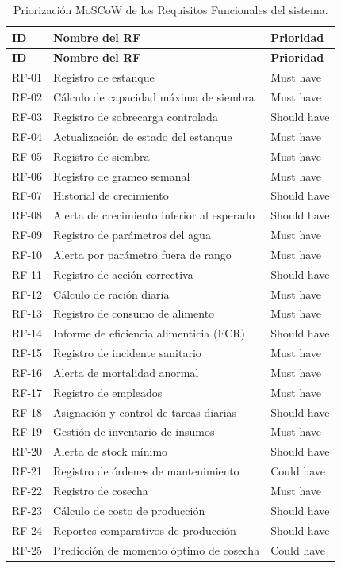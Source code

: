 \documentclass[11pt,a4paper]{article}
\begin{document}
\begin{longtable}{|p{2cm}|p{8cm}|p{4cm}|}
\caption{Priorización MoSCoW de los Requisitos Funcionales del sistema.}
\label{tab:moscow-rf} \\
\hline

\textbf{ID} & \textbf{Nombre del RF} & \textbf{Prioridad} \\
\hline

\endfirsthead

\hline
\textbf{ID} & \textbf{Nombre del RF} & \textbf{Prioridad} \\
\hline
\endhead

\hline
\endfoot

\hline
\endlastfoot

RF-01 & Registro de estanque & Must have \\
\hline
RF-02 & Cálculo de capacidad máxima de siembra & Must have \\
\hline
RF-03 & Registro de sobrecarga controlada & Should have \\
\hline
RF-04 & Actualización de estado del estanque & Must have \\
\hline
RF-05 & Registro de siembra & Must have \\
\hline
RF-06 & Registro de grameo semanal & Must have \\
\hline
RF-07 & Historial de crecimiento & Should have \\
\hline
RF-08 & Alerta de crecimiento inferior al esperado & Should have \\
\hline
RF-09 & Registro de parámetros del agua & Must have \\
\hline
RF-10 & Alerta por parámetro fuera de rango & Must have \\
\hline
RF-11 & Registro de acción correctiva & Should have \\
\hline
RF-12 & Cálculo de ración diaria & Must have \\
\hline
RF-13 & Registro de consumo de alimento & Must have \\
\hline
RF-14 & Informe de eficiencia alimenticia (FCR) & Should have \\
\hline
RF-15 & Registro de incidente sanitario & Must have \\
\hline
RF-16 & Alerta de mortalidad anormal & Must have \\
\hline
RF-17 & Registro de empleados & Must have \\
\hline
RF-18 & Asignación y control de tareas diarias & Should have \\
\hline
RF-19 & Gestión de inventario de insumos & Must have \\
\hline
RF-20 & Alerta de stock mínimo & Should have \\
\hline
RF-21 & Registro de órdenes de mantenimiento & Could have \\
\hline
RF-22 & Registro de cosecha & Must have \\
\hline
RF-23 & Cálculo de costo de producción & Should have \\
\hline
RF-24 & Reportes comparativos de producción & Should have \\
\hline
RF-25 & Predicción de momento óptimo de cosecha & Could have \\
\hline


\end{longtable}
\end{document}
